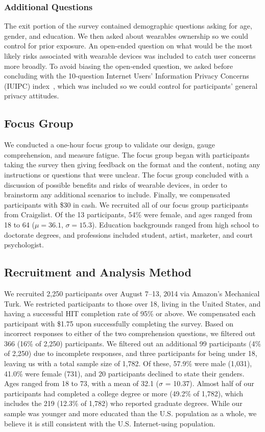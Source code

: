 \subsubsection{Additional Questions}
The exit portion of the survey contained demographic questions asking for age, gender, and education. We then asked about wearables ownership so we could control for prior exposure. An open-ended question on what would be the most likely risks associated with wearable devices was included to catch user concerns more broadly. To avoid biasing the open-ended question, we asked before concluding with the 10-question Internet Users' Information Privacy Concerns (IUIPC) index~\cite{malhotra2004internet}, which was included so we could control for participants' general privacy attitudes.

\subsection{Focus Group}
We conducted a one-hour focus group to validate our design, gauge comprehension, and measure fatigue. The focus group began with participants taking the survey then giving feedback on the format and the content, noting any instructions or questions that were unclear. The focus group concluded with a discussion of possible benefits and risks of wearable devices, in order to brainstorm any additional scenarios to include. Finally, we compensated participants with \$30 in cash. We recruited all of our focus group participants from Craigslist. Of the 13 participants, 54\% were female, and ages ranged from 18 to 64 ($\mu = 36.1$, $\sigma = 15.3$).  Education backgrounds ranged from high school to doctorate degrees, and professions included student, artist, marketer, and court psychologist.

\subsection{Recruitment and Analysis Method}
We recruited 2,250 participants over August 7--13, 2014 via Amazon's Mechanical Turk. We restricted participants to those over 18, living in the United States, and having a successful HIT completion rate of 95\% or above. We compensated each participant with \$1.75 upon successfully completing the survey. Based on incorrect responses to either of the two comprehension questions, we filtered out 366 (16\% of 2,250) participants. We filtered out an additional 99 participants (4\% of 2,250) due to incomplete responses, and three participants for being under 18, leaving us with a total sample size of 1,782. Of these, 57.9\% were male (1,031), 41.0\% were female (731), and 20 participants declined to state their genders. Ages ranged from 18 to 73, with a mean of 32.1 ($\sigma$ = 10.37). Almost half of our participants had completed a college degree or more (49.2\% of 1,782), which includes the 219 (12.3\% of 1,782) who reported graduate degrees. While our sample was younger and more educated than the U.S. population as a whole, we believe it is still consistent with the U.S. Internet-using population.

